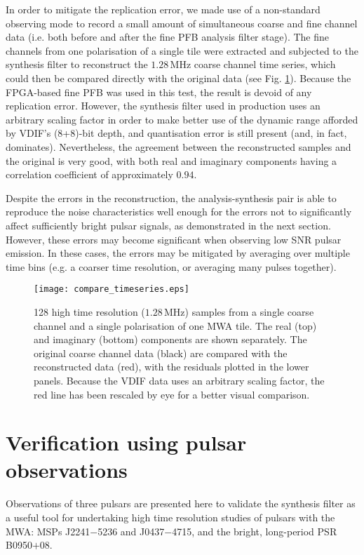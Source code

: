 \documentclass{pasa}%
\newcommand{\psrslowB}{B0950$+$08}
\newcommand{\psrkaurJ}{J2241$-$5236}
\newcommand{\psrbhatJ}{J0437$-$4715}
\begin{document}
In order to mitigate the replication error, we made use of a non-standard observing mode to record a small amount of simultaneous coarse and fine channel data (i.e. both before and after the fine PFB analysis filter stage).
The fine channels from one polarisation of a single tile were extracted and subjected to the synthesis filter to reconstruct the $1.28\,$MHz coarse channel time series, which could then be compared directly with the original data (see Fig. \ref{fig:compare_timeseries}).
Because the FPGA-based fine PFB was used in this test, the result is devoid of any replication error.
However, the synthesis filter used in production uses an arbitrary scaling factor in order to make better use of the dynamic range afforded by VDIF's (8+8)-bit depth, and quantisation error is still present (and, in fact, dominates).
Nevertheless, the agreement between the reconstructed samples and the original is very good, with both real and imaginary components having a correlation coefficient of approximately $0.94$.

Despite the errors in the reconstruction, the analysis-synthesis pair is able to reproduce the noise characteristics well enough for the errors not to significantly affect sufficiently bright pulsar signals, as demonstrated in the next section.
However, these errors may become significant when observing low SNR pulsar emission. In these cases, the errors may be mitigated by averaging over multiple time bins (e.g. a coarser time resolution, or averaging many pulses together).

\begin{figure}
    \centering
    \texttt{[image: compare\_timeseries.eps]}
    \caption{128 high time resolution ($1.28\,$MHz) samples from a single coarse channel and a single polarisation of one MWA tile. The real (top) and imaginary (bottom) components are shown separately. The original coarse channel data (black) are compared with the reconstructed data (red), with the residuals plotted in the lower panels. Because the VDIF data uses an arbitrary scaling factor, the red line has been rescaled by eye for a better visual comparison.}
    \label{fig:compare_timeseries}
\end{figure}

\section{Verification using pulsar observations}
\label{sec:pulsardata}

Observations of three pulsars are presented here to validate the synthesis filter as a useful tool for undertaking high time resolution studies of pulsars with the MWA: MSPs \psrkaurJ{} and \psrbhatJ{}, and the bright, long-period PSR \psrslowB{}.
\end{document}
